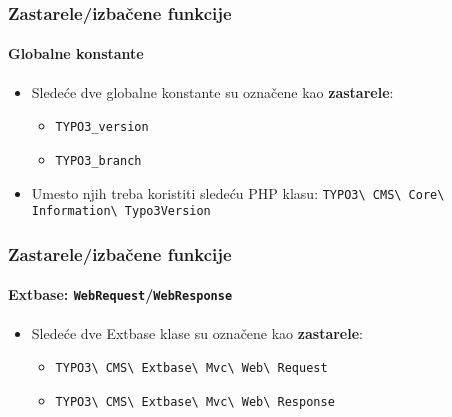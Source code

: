 \begin{frame}[fragile]
	\frametitle{Zastarele/izbačene funkcije}
	\framesubtitle{Globalne konstante}

	\lstset{basicstyle=\smaller\ttfamily}

	\begin{itemize}
		\item Sledeće dve globalne konstante su označene kao \textbf{zastarele}:

			\begin{itemize}
				\item \texttt{TYPO3\_version}
				\item \texttt{TYPO3\_branch}
			\end{itemize}

		\item Umesto njih treba koristiti sledeću PHP klasu:\newline
			\small
				\texttt{TYPO3\textbackslash
					CMS\textbackslash
					Core\textbackslash
					Information\textbackslash
					Typo3Version}\normalsize

	\end{itemize}

\end{frame}


\begin{frame}[fragile]
	\frametitle{Zastarele/izbačene funkcije}
	\framesubtitle{Extbase: \texttt{WebRequest}/\texttt{WebResponse}}

	\begin{itemize}
		\item Sledeće dve Extbase klase su označene kao \textbf{zastarele}:
			\begin{itemize}
				\item \texttt{TYPO3\textbackslash
					CMS\textbackslash
					Extbase\textbackslash
					Mvc\textbackslash
					Web\textbackslash
					Request}
				\item \texttt{TYPO3\textbackslash
					CMS\textbackslash
					Extbase\textbackslash
					Mvc\textbackslash
					Web\textbackslash
					Response}
			\end{itemize}

	\end{itemize}

\end{frame}

